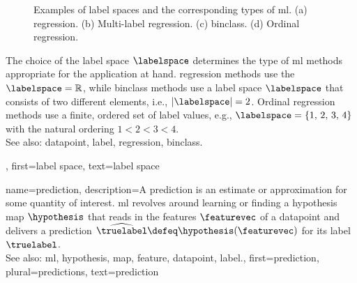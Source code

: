 {{\begin{figure}[H]
		\caption{\label{fig_label_spaces_dict} Examples of \gls{label} spaces and the corresponding types of \gls{ml}.
			(a) \Gls{regression}. (b) Multi-label \gls{regression}. (c) \Gls{binclass}. (d) Ordinal \gls{regression}.}
		\end{figure}
		The choice of the \gls{label} space $\labelspace$ determines the type of \gls{ml} methods 
		appropriate for the application at hand. \Gls{regression} methods use the $\labelspace = \mathbb{R}$, 
		while \gls{binclass} methods use a \gls{label} space $\labelspace$ that consists of two different 
		elements, i.e., $|\labelspace|=2$. Ordinal \gls{regression} methods use a finite, ordered set of 
		\gls{label} values, e.g., $\labelspace = \{1,\,2,\,3,\,4\}$ with the natural ordering $1 < 2 < 3 < 4$. 
					\\ 
		See also:  \gls{datapoint}, \gls{label}, \gls{regression}, \gls{binclass}.}, 
	first={label space},
	text={label space}  
}

{name={prediction},
	description={A prediction is an estimate or approximation for some 
		quantity of interest. \Gls{ml} revolves around learning or finding a \gls{hypothesis} \gls{map} $\hypothesis$ 
		that reads in the \glspl{feature} $\featurevec$ of a \gls{datapoint} and delivers a prediction 
		$\widehat{\truelabel} \defeq \hypothesis(\featurevec)$ for its \gls{label} $\truelabel$.
					\\ 
		See also: \gls{ml}, \gls{hypothesis}, \gls{map}, \gls{feature}, \gls{datapoint}, \gls{label}.},
	first={prediction},
	plural={predictions},
	text={prediction}  
}

